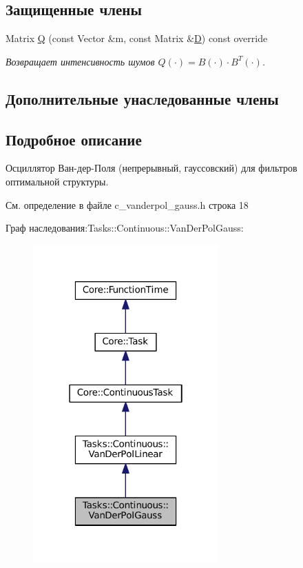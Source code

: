 \subsection*{Защищенные члены}
\begin{DoxyCompactItemize}
\item 
\hypertarget{class_tasks_1_1_continuous_1_1_van_der_pol_gauss_aefe0f9432c2c283fba65ca73e6092f28}{}\label{class_tasks_1_1_continuous_1_1_van_der_pol_gauss_aefe0f9432c2c283fba65ca73e6092f28} 
Matrix \hyperlink{class_tasks_1_1_continuous_1_1_van_der_pol_gauss_aefe0f9432c2c283fba65ca73e6092f28}{Q} (const Vector \&m, const Matrix \&\hyperlink{class_tasks_1_1_continuous_1_1_van_der_pol_linear_a07e8842a175006f214238a9f71e5ebdf}{D}) const override
\begin{DoxyCompactList}\small\item\em Возвращает интенсивность шумов $Q(\cdot) = B(\cdot) \cdot B^T(\cdot)$. \end{DoxyCompactList}\end{DoxyCompactItemize}
\subsection*{Дополнительные унаследованные члены}


\subsection{Подробное описание}
Осциллятор Ван-\/дер-\/Поля (непрерывный, гауссовский) для фильтров оптимальной структуры. 

См. определение в файле c\+\_\+vanderpol\+\_\+gauss.\+h строка 18



Граф наследования\+:Tasks\+:\+:Continuous\+:\+:Van\+Der\+Pol\+Gauss\+:
\nopagebreak
\begin{figure}[H]
\begin{center}
\leavevmode
\includegraphics[width=202pt]{class_tasks_1_1_continuous_1_1_van_der_pol_gauss__inherit__graph}
\end{center}
\end{figure}


